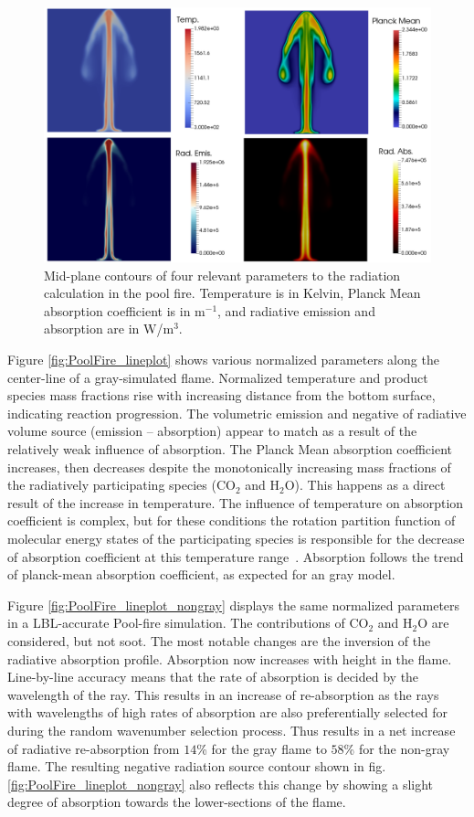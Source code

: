 \begin{figure}
\centering
\includegraphics[width=0.9\linewidth]{figures/ch4/PoolFire_quadcomparison.png}
\caption{Mid-plane contours of four relevant parameters to the radiation calculation in the pool fire. Temperature is in Kelvin, Planck Mean absorption coefficient is in m$^{-1}$, and radiative emission and absorption are in W/m$^3$.}
\label{fig:PoolFire_quadcomparison}
\end{figure}

Figure \ref{fig:PoolFire_lineplot} shows various normalized parameters along the center-line of a gray-simulated flame. 
Normalized temperature and product species mass fractions rise with increasing distance from the bottom surface, indicating reaction progression. 
The volumetric emission and negative of radiative volume source (emission – absorption) appear to match as a result of the relatively weak influence of absorption.
The Planck Mean absorption coefficient increases, then decreases despite the monotonically increasing mass fractions of the radiatively participating species (CO$_2$ and H$_2$O). This happens as a direct result of the increase in temperature. 
The influence of temperature on absorption coefficient is complex, but for these conditions the rotation partition function of molecular energy states of the participating species is responsible for the decrease of absorption coefficient at this temperature range~\cite{Modest2013RadiativeTransfer}.
Absorption follows the trend of planck-mean absorption coefficient, as expected for an gray model.

Figure \ref{fig:PoolFire_lineplot_nongray} displays the same normalized parameters in a LBL-accurate Pool-fire simulation. The contributions of CO$_2$ and H$_2$O are considered, but not soot.
The most notable changes are the inversion of the radiative absorption profile. Absorption now increases with height in the flame. Line-by-line accuracy means that the rate of absorption is decided by the wavelength of the ray.
This results in an increase of re-absorption as the rays with wavelengths of high rates of absorption are also preferentially selected for during the random wavenumber selection process. Thus results in a net increase of radiative re-absorption from $14$\% for the gray flame to $58$\% for the non-gray flame.
The resulting negative radiation source contour shown in fig. \ref{fig:PoolFire_lineplot_nongray} also reflects this change by showing a slight degree of absorption towards the lower-sections of the flame.

